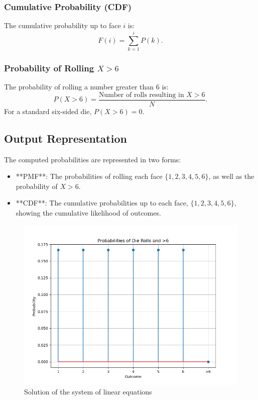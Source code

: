 \documentclass[journal]{IEEEtran}
\begin{document}
\subsubsection*{Cumulative Probability (CDF)}
The cumulative probability up to face \( i \) is:
\[
F(i) = \sum_{k=1}^{i} P(k).
\]

\subsubsection*{Probability of Rolling \( X > 6 \)}
The probability of rolling a number greater than 6 is:
\[
P(X > 6) = \frac{\text{Number of rolls resulting in } X > 6}{N}.
\]
For a standard six-sided die, \( P(X > 6) = 0 \).

\subsection*{Output Representation}
The computed probabilities are represented in two forms:
\begin{itemize}
    \item **PMF**: The probabilities of rolling each face \( \{1, 2, 3, 4, 5, 6\} \), as well as the probability of \( X > 6 \).
    \item **CDF**: The cumulative probabilities up to each face, \( \{1, 2, 3, 4, 5, 6\} \), showing the cumulative likelihood of outcomes.
\end{itemize}
	\begin{figure}[h!]
		\centering
		\includegraphics[width=\columnwidth]{figs/fig1.png}
		\caption{Solution of the system of linear equations}
		\label{stemplot}
	\end{figure}
	
\end{document}

